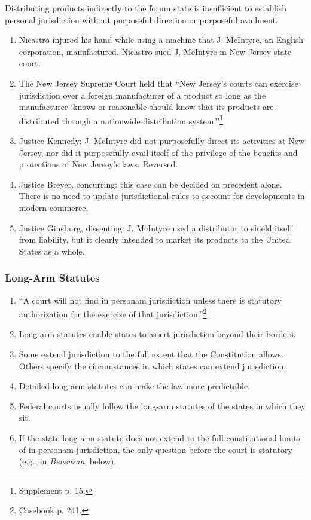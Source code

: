 Distributing products indirectly to the forum state is insufficient to 
establish personal jurisdiction without purposeful direction or purposeful 
availment.

\begin{enumerate}
    \item Nicastro injured his hand while using a machine that J. McIntyre, an 
    English corporation, manufactured. Nicastro sued J. McIntyre in New Jersey 
    state court. 
    \item The New Jersey Supreme Court held that ``New Jersey's courts can 
    exercise jurisdiction over a foreign manufacturer of a product so long as 
    the manufacturer `knows or reasonable should know that its products are 
    distributed through a nationwide distribution 
    system.''\footnote{Supplement p. 15.}
    \item Justice Kennedy: J. McIntyre did not purposefully direct its 
    activities at New Jersey, nor did it purposefully avail itself of the 
    privilege of the benefits and protections of New Jersey's laws. Reversed.
    \item Justice Breyer, concurring: this case can be decided on precedent 
    alone. There is no need to update jurisdictional rules to account for 
    developments in modern commerce.
    \item Justice Ginsburg, dissenting: J. McIntyre used a distributor to 
    shield itself from liability, but it clearly intended to market its 
    products to the United States as a whole.
\end{enumerate}

\subsubsection{Long-Arm Statutes}

\begin{enumerate}
    \item ``A court will not find in personam jurisdiction unless there is 
    statutory authorization for the exercise of that 
    jurisdiction.''\footnote{Casebook p. 241.}
    \item Long-arm statutes enable states to assert jurisdiction beyond their 
    borders.
    \item Some extend jurisdiction to the full extent that the Constitution 
    allows. Others specify the circumstances in which states can extend 
    jurisdiction.
    \item Detailed long-arm statutes can make the law more predictable.
    \item Federal courts usually follow the long-arm statutes of the states in 
    which they sit.
    \item If the state long-arm statute does not extend to the full 
    constitutional limits of in personam jurisdiction, the only question 
    before the court is statutory (e.g., in \emph{Bensusan}, below).
\end{enumerate}

